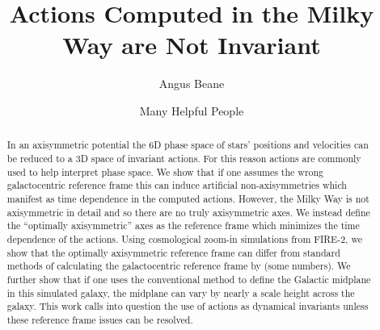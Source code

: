 \documentclass[twocolumn]{aastex62}
\begin{document}
\title{Actions Computed in the Milky Way are Not Invariant}


\author{Angus Beane}

\author{Many Helpful People}
\noaffiliation

\begin{abstract}

In an axisymmetric potential the 6D phase space of stars' positions and
velocities can be reduced to a 3D space of invariant actions. For this reason
actions are commonly used to help interpret phase space. We show that if one
assumes the wrong galactocentric reference frame this can induce artificial
non-axisymmetries which manifest as time dependence in the computed actions.
However, the Milky Way is not axisymmetric in detail and so there are no
truly axisymmetric axes. We instead define the  ``optimally axisymmetric''
axes as the reference frame which minimizes the time dependence of the
actions. Using cosmological zoom-in simulations from FIRE-2, we show that the
optimally axisymmetric reference frame can differ from standard methods of
calculating the galactocentric reference frame by (some numbers). We further
show that if one uses the conventional method to define the Galactic midplane
in this simulated galaxy, the midplane can vary by nearly a scale height
across the galaxy. This work calls into question the use of actions as
dynamical invariants unless these reference frame issues can be resolved.



\end{abstract}
\end{document}
